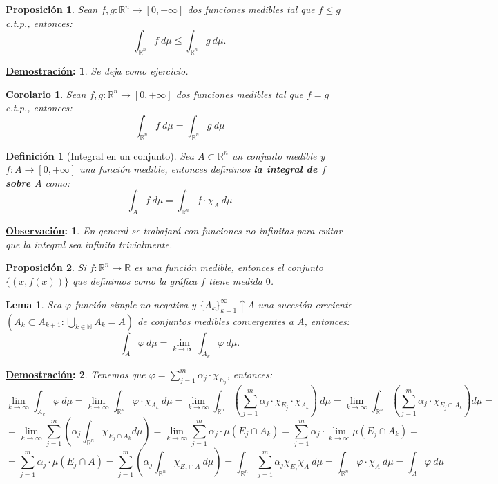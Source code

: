 \documentclass[10pt,a4paper,openright]{book}
\theoremstyle{break}
\newtheorem*{defi}{Definición}
\newtheorem*{coro}{Corolario}
\newtheorem*{lema}{Lema}
\newtheorem*{prop}{Proposición}
\newtheorem*{demo}{\underline{Demostración}:}
\newtheorem*{obs}{\underline{Observación}:}
\begin{document}
\begin{prop}
Sean $f, g: \mathbb{R}^n \rightarrow \left[0, +\infty\right]$ dos funciones medibles tal que $f \le g$ c.t.p., entonces:
$$\int_{\mathbb{R}^n}f \ d \mu \le \int_{\mathbb{R}^n}g \ d \mu.$$
\end{prop}
\begin{demo}
Se deja como ejercicio.
\end{demo}

\begin{coro}
Sean $f, g: \mathbb{R}^n \rightarrow \left[0, +\infty\right]$ dos funciones medibles tal que $f = g$ c.t.p., entonces:
$$\int_{\mathbb{R}^n}f \ d \mu = \int_{\mathbb{R}^n} g \ d \mu$$
\end{coro}

\begin{defi}[Integral en un conjunto]
Sea $A \subset \mathbb{R}^n$ un conjunto medible y $f: A \rightarrow \left[0, +\infty\right]$ una función medible, entonces definimos \textbf{la integral de $f$ sobre $A$} como:
$$\int_A f \ d \mu = \int_{\mathbb{R}^n}f \cdot \chi_{A} \ d \mu$$
\end{defi}

\begin{obs}
En general se trabajará con funciones no infinitas para evitar que la integral sea infinita trivialmente.
\end{obs}

\begin{prop}
Si $f:\mathbb{R}^n\rightarrow \mathbb{R}$ es una función medible, entonces el conjunto $\{(x, f(x))\}$ que definimos como la gráfica $f$ tiene medida $0$.
\end{prop}

\begin{lema}
Sea $\varphi$ función simple no negativa y $\{A_k\}_{k=1}^{\infty}\uparrow A$ una sucesión creciente $\left(A_k \subset A_{k+1} : \bigcup_{k \in \mathbb{N}} A_k = A\right)$ de conjuntos medibles convergentes a $A$, entonces:
$$\int_A \varphi \ d \mu = \lim_{k\rightarrow\infty} \int_{A_k} \varphi \ d \mu.$$
\end{lema}
\begin{demo}
Tenemos que $\varphi = \sum_{j=1}^{m} \alpha_j \cdot \chi_{E_j}$, entonces:
$$\lim_{k\rightarrow\infty} \int_{A_k} \varphi \ d \mu = \lim_{k\rightarrow\infty} \int_{\mathbb{R}^n}\varphi \cdot \chi_{A_k} \ d \mu = \lim_{k\rightarrow\infty} \int_{\mathbb{R}^n} \left(\sum_{j=1}^{m} \alpha_j \cdot \chi_{E_j}\cdot \chi_{A_k}\right) \ d \mu= \lim_{k\rightarrow\infty} \int_{\mathbb{R}^n} \left(\sum_{j=1}^{m} \alpha_j \cdot \chi_{E_j \cap A_k}\right) d \mu = $$
$$= \lim_{k\rightarrow\infty} \sum_{j=1}^{m} \left( \alpha_j \int_{\mathbb{R}^n} \chi_{E_j \cap A_k} d \mu \right) = \lim_{k\rightarrow\infty} \sum_{j=1}^{m} \alpha_j \cdot \mu\left(E_j \cap A_k\right) = \sum_{j=1}^{m} \alpha_j \cdot \lim_{k\rightarrow\infty} \mu\left(E_j \cap A_k\right) = $$
$$= \sum_{j=1}^{m} \alpha_j \cdot \mu\left(E_j \cap A\right) = \sum_{j=1}^{m} \left(\alpha_j \int_{\mathbb{R}^n} \chi_{E_j \cap A} \ d \mu\right) = \int_{\mathbb{R}^n}\sum_{j=1}^{m} \alpha_j \chi_{E_j} \chi_{A} \ d \mu= \int_{\mathbb{R}^n} \varphi \cdot \chi_A \ d \mu = \int_A \varphi \ d \mu$$
\end{demo}
\end{document}
